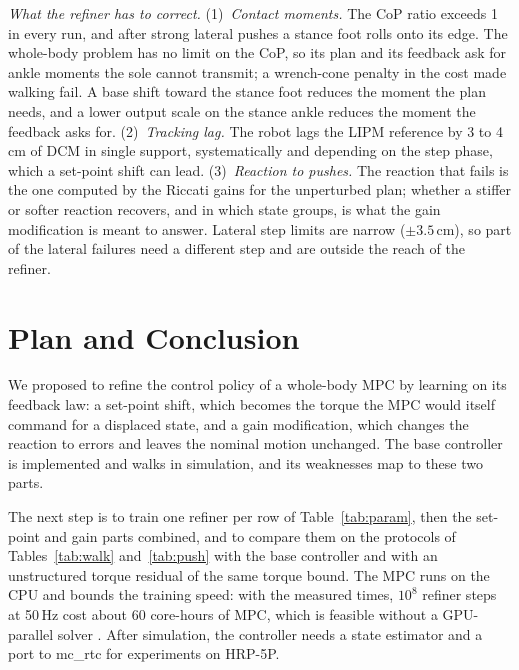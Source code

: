 \documentclass[conference]{IEEEtran}
\begin{document}
\emph{What the refiner has to correct.}
(1)~\emph{Contact moments.} The CoP ratio exceeds 1 in every run, and after strong lateral pushes a stance foot rolls onto its edge.
The whole-body problem has no limit on the CoP, so its plan and its feedback ask for ankle moments the sole cannot transmit; a wrench-cone penalty in the cost made walking fail.
A base shift toward the stance foot reduces the moment the plan needs, and a lower output scale on the stance ankle reduces the moment the feedback asks for.
(2)~\emph{Tracking lag.} The robot lags the LIPM reference by 3 to 4\,cm of DCM in single support, systematically and depending on the step phase, which a set-point shift can lead.
(3)~\emph{Reaction to pushes.} The reaction that fails is the one computed by the Riccati gains for the unperturbed plan; whether a stiffer or softer reaction recovers, and in which state groups, is what the gain modification is meant to answer.
Lateral step limits are narrow ($\pm3.5$\,cm), so part of the lateral failures need a different step and are outside the reach of the refiner.

\section{Plan and Conclusion}
\label{sec:plan}

We proposed to refine the control policy of a whole-body MPC by learning on its feedback law: a set-point shift, which becomes the torque the MPC would itself command for a displaced state, and a gain modification, which changes the reaction to errors and leaves the nominal motion unchanged.
The base controller is implemented and walks in simulation, and its weaknesses map to these two parts.

The next step is to train one refiner per row of Table~\ref{tab:param}, then the set-point and gain parts combined, and to compare them on the protocols of Tables~\ref{tab:walk} and~\ref{tab:push} with the base controller and with an unstructured torque residual of the same torque bound.
The MPC runs on the CPU and bounds the training speed: with the measured times, $10^8$ refiner steps at 50\,Hz cost about 60 core-hours of MPC, which is feasible without a GPU-parallel solver \cite{jeon2025residualmpc}.
After simulation, the controller needs a state estimator and a port to mc\_rtc for experiments on HRP-5P.

\begingroup
\renewcommand{\footnotesize}{\fontsize{7.3}{8.3}\selectfont}
\setlength{\itemsep}{0pt}


\endgroup
\end{document}
